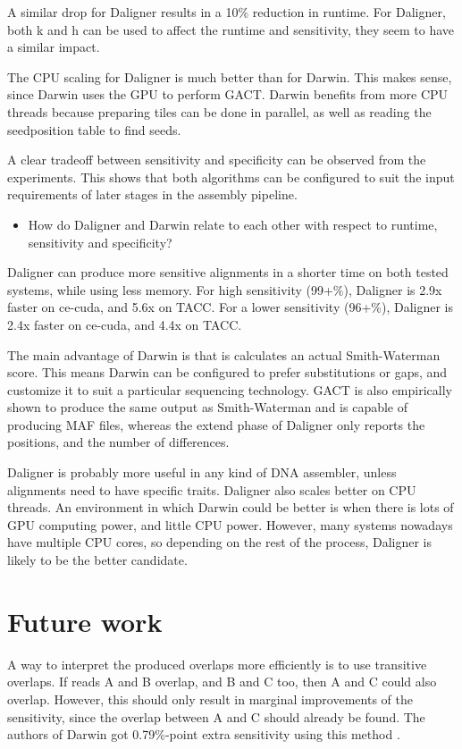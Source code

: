 \documentclass[../thesis.tex]{subfiles}
\begin{document}
A similar drop for Daligner results in a 10\% reduction in runtime.
For Daligner, both k and h can be used to affect the runtime and sensitivity, they seem to have a similar impact.

The CPU scaling for Daligner is much better than for Darwin.
This makes sense, since Darwin uses the GPU to perform GACT.
Darwin benefits from more CPU threads because preparing tiles can be done in parallel, as well as reading the seedposition table to find seeds.

A clear tradeoff between sensitivity and specificity can be observed from the experiments.
This shows that both algorithms can be configured to suit the input requirements of later stages in the assembly pipeline.


\begin{itemize}
\item How do Daligner and Darwin relate to each other with respect to runtime, sensitivity and specificity?
\end{itemize}
Daligner can produce more sensitive alignments in a shorter time on both tested systems, while using less memory.
For high sensitivity (99+\%), Daligner is 2.9x faster on ce-cuda, and 5.6x on TACC.
For a lower sensitivity (96+\%), Daligner is 2.4x faster on ce-cuda, and 4.4x on TACC.

The main advantage of Darwin is that is calculates an actual Smith-Waterman score.
This means Darwin can be configured to prefer substitutions or gaps, and customize it to suit a particular sequencing technology.
GACT is also empirically shown to produce the same output as Smith-Waterman and is capable of producing MAF files, whereas the extend phase of Daligner only reports the positions, and the number of differences.

Daligner is probably more useful in any kind of DNA assembler, unless alignments need to have specific traits.
Daligner also scales better on CPU threads.
An environment in which Darwin could be better is when there is lots of GPU computing power, and little CPU power.
However, many systems nowadays have multiple CPU cores, so depending on the rest of the process, Daligner is likely to be the better candidate.


\section{Future work}

A way to interpret the produced overlaps more efficiently is to use transitive overlaps.
If reads A and B overlap, and B and C too, then A and C could also overlap.
However, this should only result in marginal improvements of the sensitivity, since the overlap between A and C should already be found.
The authors of Darwin got 0.79\%-point extra sensitivity using this method \cite{Darwin1}.
\end{document}
